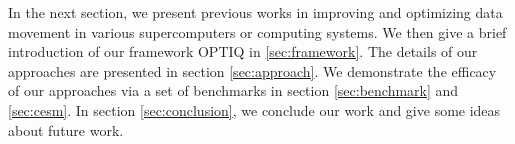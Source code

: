 In the next section, we present previous works in improving and optimizing data movement in various supercomputers or computing systems. We then give a brief introduction of our framework OPTIQ in \ref{sec:framework}. The details of our approaches are presented in section \ref{sec:approach}. We demonstrate the efficacy of our approaches via a set of benchmarks in section \ref{sec:benchmark} and \ref{sec:cesm}. In section \ref{sec:conclusion}, we conclude our work and give some ideas about future work.
